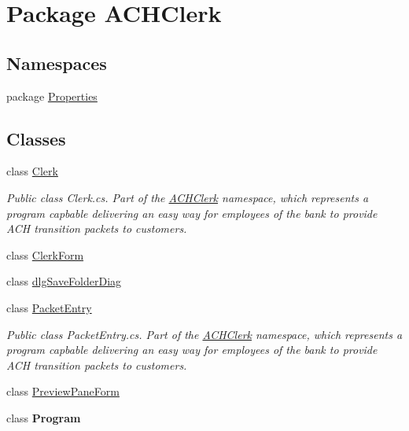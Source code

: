 \hypertarget{namespace_a_c_h_clerk}{\section{Package A\+C\+H\+Clerk}
\label{namespace_a_c_h_clerk}
}
\subsection*{Namespaces}
\begin{DoxyCompactItemize}
\item 
package \hyperlink{namespace_a_c_h_clerk_1_1_properties}{Properties}
\end{DoxyCompactItemize}
\subsection*{Classes}
\begin{DoxyCompactItemize}
\item 
class \hyperlink{class_a_c_h_clerk_1_1_clerk}{Clerk}
\begin{DoxyCompactList}\small\item\em Public class Clerk.\+cs. Part of the \hyperlink{namespace_a_c_h_clerk}{A\+C\+H\+Clerk} namespace, which represents a program capbable delivering an easy way for employees of the bank to provide A\+C\+H transition packets to customers. \end{DoxyCompactList}\item 
class \hyperlink{class_a_c_h_clerk_1_1_clerk_form}{Clerk\+Form}
\item 
class \hyperlink{class_a_c_h_clerk_1_1dlg_save_folder_diag}{dlg\+Save\+Folder\+Diag}
\item 
class \hyperlink{class_a_c_h_clerk_1_1_packet_entry}{Packet\+Entry}
\begin{DoxyCompactList}\small\item\em Public class Packet\+Entry.\+cs. Part of the \hyperlink{namespace_a_c_h_clerk}{A\+C\+H\+Clerk} namespace, which represents a program capbable delivering an easy way for employees of the bank to provide A\+C\+H transition packets to customers. \end{DoxyCompactList}\item 
class \hyperlink{class_a_c_h_clerk_1_1_preview_pane_form}{Preview\+Pane\+Form}
\item 
class {\bfseries Program}
\end{DoxyCompactItemize}

